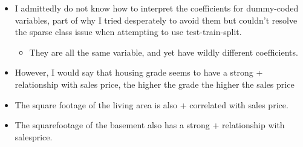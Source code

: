 \documentclass[11pt]{article}
\providecommand{\tightlist}{%
      \setlength{\itemsep}{0pt}\setlength{\parskip}{0pt}}
\begin{document}
\begin{itemize}
\tightlist
\item
  I admittedly do not know how to interpret the coefficients for
  dummy-coded variables, part of why I tried desperately to avoid them
  but couldn't resolve the sparse class issue when attempting to use
  test-train-split.

  \begin{itemize}
  \tightlist
  \item
    They are all the same variable, and yet have wildly different
    coefficients.
  \end{itemize}
\item
  However, I would say that housing grade seems to have a strong +
  relationship with sales price, the higher the grade the higher the
  sales price
\item
  The square footage of the living area is also + correlated with sales
  price.
\item
  The squarefootage of the basement also has a strong + relationship
  with salesprice.
\end{itemize}


    
    
    
    
\end{document}
